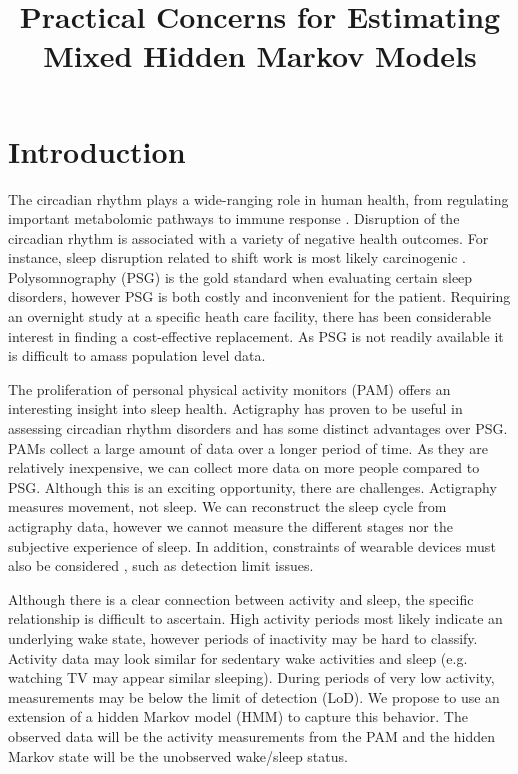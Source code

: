 \documentclass{article}
\title{Practical Concerns for Estimating Mixed Hidden Markov Models}
\author{}
\date{}
\begin{document}
\maketitle

\section{Introduction}

The circadian rhythm plays a wide-ranging role in human health, from regulating important metabolomic pathways \cite{potterCircadianRhythmSleep2016} to immune response \cite{sharmaCircadianRhythmDisruption2016}. 
Disruption of the circadian rhythm is associated with a variety of negative health outcomes. 
For instance, sleep disruption related to shift work is most likely carcinogenic \cite{iarc2010}.
Polysomnography (PSG) is the gold standard when evaluating certain sleep disorders, however PSG is both costly and inconvenient for the patient\cite{chervin1999}. 
Requiring an overnight study at a specific heath care facility, there has been considerable interest in finding a cost-effective replacement.  As PSG is not readily available it is difficult to amass population level data. 

The proliferation of personal physical activity monitors (PAM) offers an interesting insight into sleep health. 
Actigraphy has proven to be useful in assessing circadian rhythm disorders \cite{morgenthaler2007} and has some distinct advantages over PSG. 
PAMs collect a large amount of data over a longer period of time. As 
they are relatively inexpensive, we can collect more data on more people compared to PSG.  
Although this is an exciting opportunity, there are challenges. Actigraphy measures movement, not sleep. We can reconstruct the sleep cycle from actigraphy data, however we cannot measure the different stages nor the subjective experience of sleep. 
In addition, constraints of wearable devices must also be considered \cite{imtiaz2021}, such as detection limit issues. 

Although there is a clear connection between activity and sleep, the specific relationship is difficult to ascertain. 
High activity periods most likely indicate an underlying wake state, however periods of inactivity may be hard to classify. 
Activity data may look similar for sedentary wake activities and sleep (e.g. watching TV may appear similar sleeping). 
During periods of very low activity, measurements may be below the limit of detection (LoD). 
We propose to use an extension of a hidden Markov model (HMM) to capture this behavior. 
The observed data will be the activity measurements from the PAM and the hidden Markov state will be the unobserved wake/sleep status.
\end{document}
